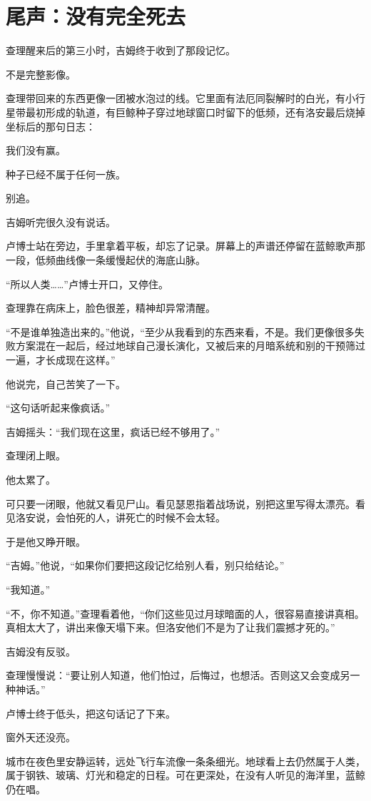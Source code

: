 \chapter{尾声：没有完全死去}

查理醒来后的第三小时，吉姆终于收到了那段记忆。

不是完整影像。

查理带回来的东西更像一团被水泡过的线。它里面有法厄同裂解时的白光，有小行星带最初形成的轨道，有巨鲸种子穿过地球窗口时留下的低频，还有洛安最后烧掉坐标后的那句日志：

我们没有赢。

种子已经不属于任何一族。

别追。

吉姆听完很久没有说话。

卢博士站在旁边，手里拿着平板，却忘了记录。屏幕上的声谱还停留在蓝鲸歌声那一段，低频曲线像一条缓慢起伏的海底山脉。

“所以人类……”卢博士开口，又停住。

查理靠在病床上，脸色很差，精神却异常清醒。

“不是谁单独造出来的。”他说，“至少从我看到的东西来看，不是。我们更像很多失败方案混在一起后，经过地球自己漫长演化，又被后来的月暗系统和别的干预筛过一遍，才长成现在这样。”

他说完，自己苦笑了一下。

“这句话听起来像疯话。”

吉姆摇头：“我们现在这里，疯话已经不够用了。”

查理闭上眼。

他太累了。

可只要一闭眼，他就又看见尸山。看见瑟恩指着战场说，别把这里写得太漂亮。看见洛安说，会怕死的人，讲死亡的时候不会太轻。

于是他又睁开眼。

“吉姆。”他说，“如果你们要把这段记忆给别人看，别只给结论。”

“我知道。”

“不，你不知道。”查理看着他，“你们这些见过月球暗面的人，很容易直接讲真相。真相太大了，讲出来像天塌下来。但洛安他们不是为了让我们震撼才死的。”

吉姆没有反驳。

查理慢慢说：“要让别人知道，他们怕过，后悔过，也想活。否则这又会变成另一种神话。”

卢博士终于低头，把这句话记了下来。

窗外天还没亮。

城市在夜色里安静运转，远处飞行车流像一条条细光。地球看上去仍然属于人类，属于钢铁、玻璃、灯光和稳定的日程。可在更深处，在没有人听见的海洋里，蓝鲸仍在唱。


